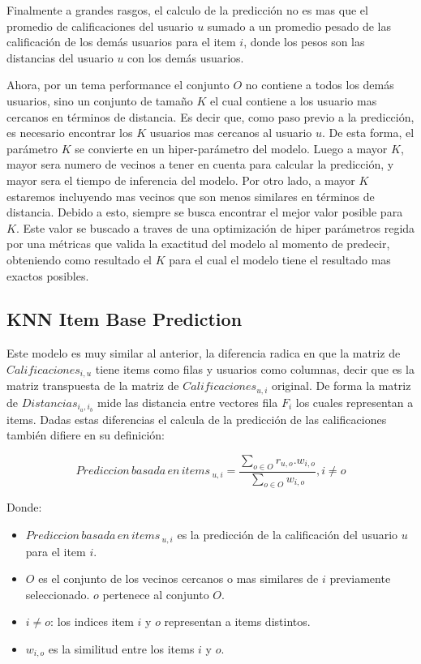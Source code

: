 \documentclass[11pt,a4paper,twoside]{thesis}
\begin{document}
Finalmente a grandes rasgos, el calculo de la predicción no es mas que el promedio de calificaciones del usuario $u$ sumado a un promedio 
pesado de las calificación de los demás usuarios para el item $i$, donde los pesos son las distancias del usuario $u$ con los demás usuarios.

Ahora, por un tema performance el conjunto $O$ no contiene a todos los demás usuarios, sino un conjunto de tamaño $K$ el cual contiene a los 
usuario mas cercanos en términos de distancia. Es decir que, como paso previo a la predicción, es necesario encontrar los $K$ usuarios mas cercanos al usuario $u$.
De esta forma, el parámetro $K$ se convierte en un hiper-parámetro del modelo. Luego a mayor $K$, mayor sera numero de vecinos a tener en cuenta para calcular
la predicción, y mayor sera el tiempo de inferencia del modelo. Por otro lado, a mayor $K$ estaremos incluyendo mas vecinos que son menos similares en 
términos de distancia. Debido a esto, siempre se busca encontrar el mejor valor posible para $K$. Este valor se buscado a traves de una optimización de hiper parámetros regida por una métricas que valida la exactitud del modelo al momento de predecir, obteniendo como resultado el $K$ para el cual el modelo tiene el resultado mas exactos posibles.

\subsection{KNN Item Base Prediction}

Este modelo es muy similar al anterior, la diferencia radica en que la matriz de $Calificaciones_{i, u}$ tiene items como filas y usuarios como columnas, decir que es la matriz transpuesta de la matriz de $Calificaciones_{u, i}$ original. De forma la matriz de $Distancias_{i_a,i_b}$ mide las distancia entre vectores fila $F_i$ los cuales representan a items. Dadas estas diferencias el calcula de la predicción de las calificaciones también difiere en su definición:


\begin{equation*}
	Prediccion \mspace{3mu}basada \mspace{3mu}en \mspace{3mu}items\mspace{3mu}_{u, i} = \frac{\sum_{o \in O} r_{u, o}. w_{i, o} }{\sum_{o \in O} w_{i, o} }, i \neq o
\end{equation*}
\begin{description}
	\item[Donde:]
\end{description}
\begin{itemize}
	\item $Prediccion \mspace{3mu}basada \mspace{3mu}en \mspace{3mu}items\mspace{3mu}_{u, i}$ es la predicción de la calificación del usuario $u$ para el item $i$.
	\item $O$ es el conjunto de los vecinos cercanos o mas similares de $i$ previamente seleccionado. $o$ pertenece al conjunto $O$.
	\item $i \neq o$: los indices item $i$ y $o$ representan a items distintos. 
	\item $w_{i,o}$ es la similitud entre los items $i$ y $o$.
\end{itemize}
\end{document}

